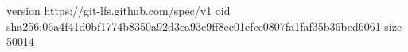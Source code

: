version https://git-lfs.github.com/spec/v1
oid sha256:06a4f41d0bf1774b8350a92d3ea93c9ff8ec01efee0807fa1faf35b36bed6061
size 50014

